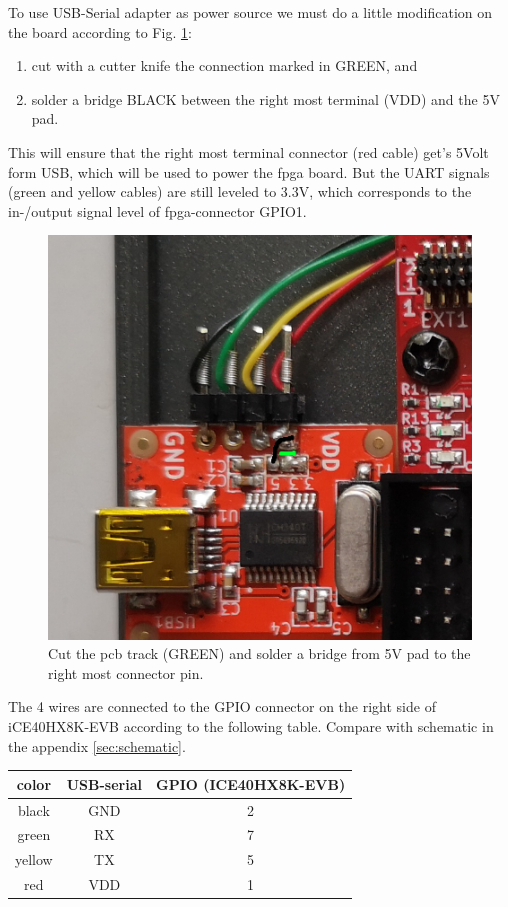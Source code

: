 \documentclass[a4paper,ngerman]{scrartcl}
\begin{document}
To use USB-Serial adapter as power source we must do a little modification on the board according to Fig. \ref{fig:detail}:
\begin{enumerate}
	\item  cut with a cutter knife the connection marked in GREEN, and
	\item  solder a bridge BLACK between the right most terminal (VDD) and the 5V pad.
\end{enumerate}

This will ensure that the right most terminal connector (red cable) get's 5Volt form USB, which will be used to power the fpga board. But the UART signals (green and yellow cables) are still leveled to 3.3V, which corresponds to the in-/output signal level of fpga-connector GPIO1.


\begin{figure}
	\centering
	\includegraphics[width=0.5\linewidth]{detail.png}
	\caption{Cut the pcb track (GREEN) and solder a bridge from 5V pad to the right most connector pin.}
	\label{fig:detail}
\end{figure}

The 4 wires are connected to the GPIO connector on the right side of iCE40HX8K-EVB according to the following table. Compare with schematic in the appendix  \ref{sec:schematic}.

\begin{table}[H]
	\centering	
	\begin{tabular}{|c|c|c|}
		\hline 
		color & USB-serial & GPIO (ICE40HX8K-EVB) \\ 
		\hline 
		black & GND & 2 \\ 
		\hline 
		green & RX & 7 \\ 
		\hline 
		yellow & TX & 5 \\ 
		\hline 
		red & VDD & 1 \\ 
		\hline 
	\end{tabular} 
\end{table}
\end{document}
